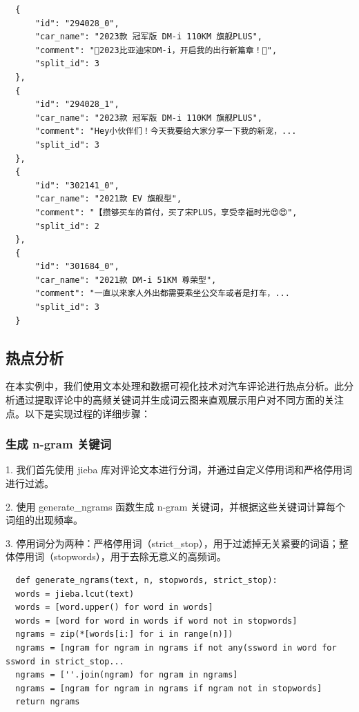 \documentclass[UTF8,a4paper,15pt,titlepage,oneside]{ctexbook}
\begin{document}
\begin{mdframed}[backgroundcolor=lightgray!20, linecolor=darkgray, linewidth=1pt]
  \begin{verbatim}
  {
      "id": "294028_0",
      "car_name": "2023款 冠军版 DM-i 110KM 旗舰PLUS",
      "comment": "🚗2023比亚迪宋DM-i，开启我的出行新篇章！🚗",
      "split_id": 3
  },
  {
      "id": "294028_1",
      "car_name": "2023款 冠军版 DM-i 110KM 旗舰PLUS",
      "comment": "Hey小伙伴们！今天我要给大家分享一下我的新宠，...
      "split_id": 3
  },
  {
      "id": "302141_0",
      "car_name": "2021款 EV 旗舰型",
      "comment": "【攒够买车的首付，买了宋PLUS，享受幸福时光😍😍",
      "split_id": 2
  },
  {
      "id": "301684_0",
      "car_name": "2021款 DM-i 51KM 尊荣型",
      "comment": "一直以来家人外出都需要乘坐公交车或者是打车，...
      "split_id": 3
  }
\end{verbatim}
  \end{mdframed}



\subsection{热点分析}

在本实例中，我们使用文本处理和数据可视化技术对汽车评论进行热点分析。此分析通过提取评论中的高频关键词并生成词云图来直观展示用户对不同方面的关注点。以下是实现过程的详细步骤：

\subsubsection{生成 n-gram 关键词}

1. 我们首先使用 jieba 库对评论文本进行分词，并通过自定义停用词和严格停用词进行过滤。

2. 使用 generate\_ngrams 函数生成 n-gram 关键词，并根据这些关键词计算每个词组的出现频率。

3. 停用词分为两种：严格停用词（strict\_stop），用于过滤掉无关紧要的词语；整体停用词（stopwords），用于去除无意义的高频词。

\begin{mdframed}[backgroundcolor=darkgray, linecolor=lightgray, linewidth=1pt, innermargin=0.5cm, outermargin=0.5cm, skipbelow=0.1cm]
  \color{white}
  \begin{verbatim}
  def generate_ngrams(text, n, stopwords, strict_stop):
  words = jieba.lcut(text)
  words = [word.upper() for word in words]
  words = [word for word in words if word not in stopwords]
  ngrams = zip(*[words[i:] for i in range(n)])
  ngrams = [ngram for ngram in ngrams if not any(ssword in word for ssword in strict_stop...
  ngrams = [''.join(ngram) for ngram in ngrams]
  ngrams = [ngram for ngram in ngrams if ngram not in stopwords]
  return ngrams
\end{verbatim}  
\end{mdframed}
\end{document}

